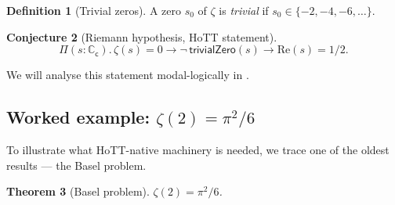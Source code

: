 \documentclass[12pt]{article}
\newtheorem{theorem}{Theorem}[section]
\newtheorem{conjecture}[theorem]{Conjecture}
\theoremstyle{definition}
\newtheorem{definition}[theorem]{Definition}
\theoremstyle{remark}
\newcommand{\C}{\mathbb{C}}
\newcommand{\Cc}{\C_{\mathsf{c}}}
\begin{document}
\begin{definition}[Trivial zeros]
A zero $s_0$ of $\zeta$ is \emph{trivial} if $s_0 \in \{-2,-4,-6,\ldots\}$.
\end{definition}

\begin{conjecture}[Riemann hypothesis, HoTT statement]\label{conj:RH}
\[
\Pi(s:\Cc).\, \zeta(s) = 0 \to \neg\,\mathsf{trivialZero}(s) \to \mathrm{Re}(s) = 1/2.
\]
\end{conjecture}

We will analyse this statement modal-logically in .

\subsection{Worked example: \texorpdfstring{$\zeta(2) = \pi^2/6$}{zeta(2) = pi squared over 6}}\label{subsec:Basel}

To illustrate what HoTT-native machinery is needed, we trace one of the
oldest results — the Basel problem.

\begin{theorem}[Basel problem]\label{thm:Basel}
$\zeta(2) = \pi^2/6$.
\end{theorem}
\end{document}
